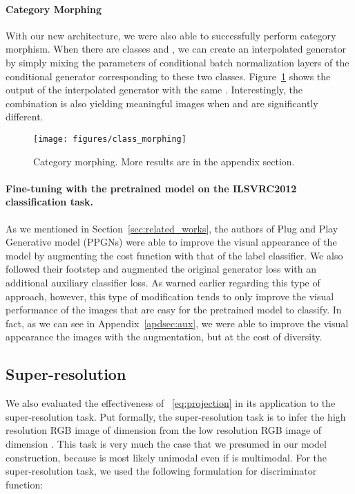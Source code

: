 \documentclass{article}
\begin{document}
\paragraph{Category Morphing}
With our new architecture, we were also able to successfully perform category morphism. When there are classes  and , we can create an interpolated generator by simply mixing the parameters of conditional batch normalization layers of the conditional generator corresponding to these two classes.
Figure~\ref{fig:class_morphing} shows the output of the interpolated generator with the same .
Interestingly, the combination is also yielding meaningful images when  and  are significantly different.   

\begin{figure}[t]
    \centering
	\texttt{[image: figures/class\_morphing]}
    \caption{\label{fig:class_morphing} Category morphing. More results are in the appendix section.}
\end{figure}
\paragraph{Fine-tuning with the pretrained model on the ILSVRC2012 classification task.}
As we mentioned in Section~\ref{sec:related_works}, the authors of  Plug and Play Generative model (PPGNs) \cite[]{nguyen2017plug} were able to improve the visual appearance of the model by augmenting the cost function with that of the label classifier.
We also followed their footstep and augmented the original generator loss with an additional auxiliary classifier loss. 
As warned earlier regarding this type of approach, however, this type of modification tends to only improve the visual performance of the images that are easy for the pretrained model to classify.  
In fact, as we can see in Appendix~\ref{apdsec:aux},  we were able to improve the visual appearance the images with the augmentation, but  at the cost of diversity.
\subsection{Super-resolution}
We also evaluated the effectiveness of ~\eqref{eq:projection} in its application to the super-resolution task.
Put formally, the super-resolution task is to infer the high resolution RGB image of dimension  
from the low resolution RGB image of dimension .
This task is very much the case that we presumed in our model construction, because  is most likely unimodal even if  is multimodal. 
For the super-resolution task, we used the following formulation for discriminator function:
\end{document}
